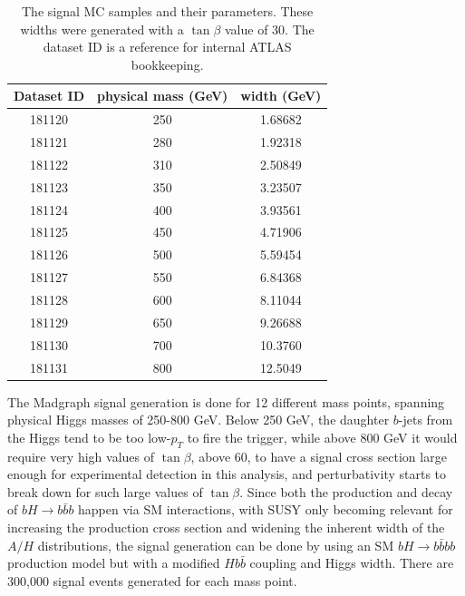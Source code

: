 


\begin{table}
   \caption{The signal MC samples and their parameters. These widths were generated with 
   a $\tan\beta$ value of 30.  The dataset ID is a reference for internal ATLAS bookkeeping.\label{tab:sig_mc_parameters} }
    \center
    \begin{tabular}{ c c c } \hline\hline
    Dataset ID & physical mass (GeV) & width (GeV) \\ \hline
    181120     & 250        & 1.68682 \\
    181121     & 280        & 1.92318 \\
    181122     & 310        & 2.50849 \\
    181123     & 350        & 3.23507 \\
    181124     & 400        & 3.93561 \\
    181125     & 450        & 4.71906 \\
    181126     & 500        & 5.59454 \\
    181127     & 550        & 6.84368 \\
    181128     & 600        & 8.11044 \\
    181129     & 650        & 9.26688 \\
    181130     & 700        & 10.3760 \\
    181131     & 800        & 12.5049 \\ \hline
    \end{tabular}
\end{table}





The Madgraph signal generation is done for 12 different mass points, spanning physical
Higgs masses of 250-800 GeV. 
Below 250 GeV, the daughter $b$-jets from the Higgs tend to be 
too low-$p_T$ to fire the trigger, while above 800 GeV it would require very 
high values of $\tan\beta$, above 60, to have a signal cross section large enough
for experimental detection in this analysis, and perturbativity starts to break
down for such large values of $\tan\beta$.
Since both the production and decay of $bH\rightarrow b\bar{b}b$ 
happen via SM interactions, with SUSY only becoming relevant for increasing the production cross section and 
widening the inherent width of the $A/H$ distributions, the signal generation can 
be done by using an SM $bH\rightarrow b\bar{b}bb$ production model but with a 
modified $Hb\bar{b}$ coupling and Higgs width.  There are 300,000 signal events generated for each mass point.

